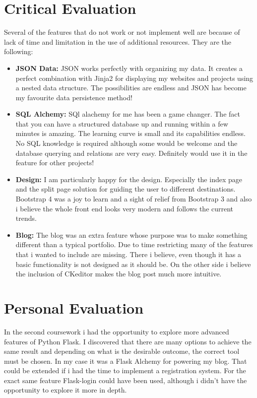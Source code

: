 \documentclass[10pt, a4paper]{article}
\begin{document}
    
    
	\section{Critical Evaluation}
	
	Several of the features that do not work or not implement well are because of lack of time and limitation in the use of additional resources. They are the following:
	\begin{itemize}
	    \item \textbf{JSON Data:} JSON works perfectly with organizing my data. It creates a perfect combination with Jinja2 for displaying my websites and projects using a nested data structure. The possibilities are endless and JSON has become my favourite data persistence method!
	    \item \textbf{SQL Alchemy:} SQl alachemy for me has been a game changer. The fact that you can have a structured database up and running within a few minutes is amazing. The learning curve is small and its capabilities endless. No SQL knowledge is required although some would be welcome and the database querying and relations are very easy. Definitely would use it in the feature for other projects!
	    \item \textbf{Design:} I am particularly happy for the design. Especially the index page and the split page solution for guiding the user to different destinations. Bootstrap 4 was a joy to learn and a sight of relief from Bootstrap 3 and also i believe the whole front end looks very modern and follows the current trends.
	    \item \textbf{Blog:} The blog was an extra feature whose purpose was to make something different than a typical portfolio. Due to time restricting many of the features that i wanted to include are missing. There i believe, even though it has a basic functionality is not designed as it should be. On the other side i believe the inclusion of CKeditor makes the blog post much more intuitive.
	\end{itemize}


	
    \section{Personal Evaluation}
    In the second coursework i had the opportunity to explore more advanced features of Python Flask. I discovered that there are many options to achieve the same result and depending on what is the desirable outcome, the correct tool must be chosen. In my case it was a Flask Alchemy for powering my blog. That could be extended if i had the time to implement a registration system. For the exact same feature Flask-login could have been used, although i didn't have the opportunity to explore it more in depth. 
    
\end{document}
